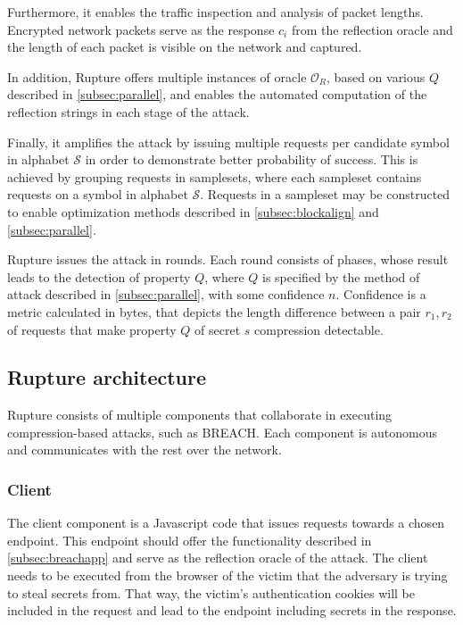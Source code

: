 \documentclass[conference, letterpaper, 10pt]{IEEEtran}
\begin{document}
Furthermore, it enables the traffic inspection and analysis of packet
lengths. Encrypted network packets serve as the response $c_i$ from the
reflection oracle and the length of each packet is visible on the network and
captured.

In addition, Rupture offers multiple instances of oracle $\mathcal{O}_R$, based
on various $Q$ described in \ref{subsec:parallel}, and enables the automated
computation of the reflection strings in each stage of the attack.

Finally, it amplifies the attack by issuing multiple requests per candidate
symbol in alphabet $\mathcal{S}$ in order to demonstrate better probability of
success. This is achieved by grouping requests in samplesets, where each
sampleset contains requests on a symbol in alphabet $\mathcal{S}$. Requests in a
sampleset may be constructed to enable optimization methods described in
\ref{subsec:blockalign} and \ref{subsec:parallel}.

Rupture issues the attack in rounds. Each round consists of phases, whose result
leads to the detection of property $Q$, where $Q$ is specified by the method of
attack described in \ref{subsec:parallel}, with some confidence $n$. Confidence
is a metric calculated in bytes, that depicts the length difference between a
pair $r_1, r_2$ of requests that make property $Q$ of secret $s$ compression
detectable.

\subsection{Rupture architecture}\label{app:rupture}
Rupture consists of multiple components that collaborate in executing
compression-based attacks, such as BREACH. Each component is autonomous and
communicates with the rest over the network.

\subsubsection{Client}

The client component is a Javascript code that issues requests towards a chosen
endpoint. This endpoint should offer the functionality described in
\ref{subsec:breachapp} and serve as the reflection oracle of the attack. The client
needs to be executed from the browser of the victim that the adversary is trying
to steal secrets from. That way, the victim's authentication cookies will be
included in the request and lead to the endpoint including secrets in the
response.
\end{document}
